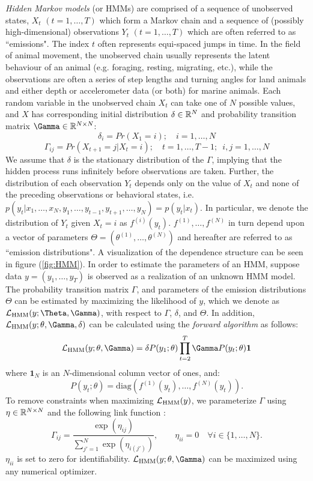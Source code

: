 \textit{Hidden Markov models} (or HMMs) are comprised of a sequence of unobserved states, $X_t$ $(t = 1, \ldots, T)$ which form a Markov chain and a sequence of (possibly high-dimensional) observations $Y_t$ $(t = 1, \ldots, T)$ which are often referred to as ``emissions". The index $t$ often represents equi-spaced jumps in time. In the field of animal movement, the unobserved chain usually represents the latent behaviour of an animal (e.g. foraging, resting, migrating, etc.), while the observations are often a series of step lengths and turning angles for land animals and either depth or accelerometer data (or both) for marine animals. Each random variable in the unobserved chain $X_t$ can take one of $N$ possible values, and $X$ has corresponding initial distribution $\delta \in \mathbb{R}^N$ and probability transition matrix $\Gamma \in \bbR^{N \times N}$:
%
$$\delta_i = Pr(X_1 = i); \quad i = 1,\ldots,N$$
%
$$\Gamma_{ij} = Pr(X_{t+1} = j | X_t = i); \quad t = 1, \ldots, T-1; \enspace i,j = 1,\ldots,N $$
%
We assume that $\delta$ is the stationary distribution of the $\Gamma$, implying that the hidden process runs infinitely before observations are taken. Further, the distribution of each observation $Y_t$ depends only on the value of $X_t$ and none of the preceding observations or behavioral states, i.e. $p(y_t|x_1,\ldots, x_N, y_1,\ldots,y_{t-1},y_{t+1},\ldots,y_N) = p(y_t|x_t)$. In particular, we denote the distribution of $Y_t$ given $X_t = i$ as $f^{(i)}(y_t)$. $f^{(1)},\ldots,f^{(N)}$ in turn depend upon a vector of parameters $\Theta = (\theta^{(1)},\ldots,\theta^{(N)})$ and hereafter are referred to as ``emission distributions". A visualization of the dependence structure can be seen in figure (\ref{fig:HMM}).
In order to estimate the parameters of an HMM, suppose data $y = (y_1,\ldots,y_T)$ is observed as a realization of an unknown HMM model. The probability transition matrix $\Gamma$, and parameters of the emission distributions $\Theta$ can be estimated by maximizing the likelihood of $y$, which we denote as $\calL_{\text{HMM}}(y;\Theta,\Gamma)$, with respect to $\Gamma$, $\delta$, and $\Theta$. In addition, $\calL_{\text{HMM}}(y;\theta,\Gamma,\delta)$ can be calculated using the \textit{forward algorithm} \cite{Zucchini:2016} as follows:
%
$$\calL_{\text{HMM}}(y;\theta,\Gamma) = \delta P(y_1;\theta) \prod_{t=2}^T \Gamma P(y_t;\theta) \mathbf{1}$$
%
where $\mathbf{1}_N$ is an $N$-dimensional column vector of ones, and:
%
$$P(y_t;\theta) = \text{diag}(f^{(1)}(y_t),\ldots , f^{(N)}(y_t)).$$
%
To remove constraints when maximizing $\mathcal{L}_{\text{HMM}}(y)$, we parameterize $\Gamma$ using $\eta \in \mathbb{R}^{N \times N}$ and the following link function \cite{Barajas:2017}:
%
$$\Gamma_{ij} = \frac{\exp(\eta_{ij})}{\sum_{j'=1}^N \exp(\eta_{i(j')})}, \qquad \eta_{ii} = 0 \quad \forall i \in \{1, \ldots, N\}.$$
%
$\eta_{ii}$ is set to zero for identifiability. $\calL_{\text{HMM}}(y;\theta,\Gamma)$ can be maximized using any numerical optimizer.

